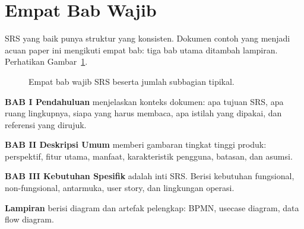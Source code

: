 \documentclass[11pt,a4paper]{article}
\begin{document}
\section{Empat Bab Wajib}

SRS yang baik punya struktur yang konsisten. Dokumen contoh yang menjadi acuan paper ini mengikuti empat bab: tiga bab utama ditambah lampiran. Perhatikan Gambar~\ref{fig:four-chapters}.

\begin{figure}[H]
	\centering
	\caption{Empat bab wajib SRS beserta jumlah subbagian tipikal.}
	\label{fig:four-chapters}
\end{figure}

\textbf{BAB I Pendahuluan} menjelaskan konteks dokumen: apa tujuan SRS, apa ruang lingkupnya, siapa yang harus membaca, apa istilah yang dipakai, dan referensi yang dirujuk.

\textbf{BAB II Deskripsi Umum} memberi gambaran tingkat tinggi produk: perspektif, fitur utama, manfaat, karakteristik pengguna, batasan, dan asumsi.

\textbf{BAB III Kebutuhan Spesifik} adalah inti SRS. Berisi kebutuhan fungsional, non-fungsional, antarmuka, user story, dan lingkungan operasi.

\textbf{Lampiran} berisi diagram dan artefak pelengkap: BPMN, usecase diagram, data flow diagram.
\end{document}
